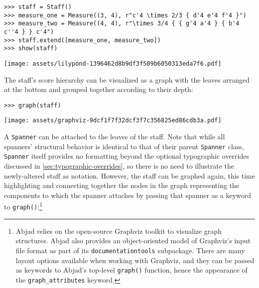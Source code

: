 \begin{abjadbookoutput}
\begin{singlespacing}
\vspace{-0.5\baselineskip}
\begin{verbatim}
>>> staff = Staff()
>>> measure_one = Measure((3, 4), r"c'4 \times 2/3 { d'4 e'4 f'4 }")
>>> measure_two = Measure((4, 4), r"\times 3/4 { { g'4 a'4 } { b'4 c''4 } } c'4")
>>> staff.extend([measure_one, measure_two])
>>> show(staff)
\end{verbatim}
\noindent\texttt{[image: assets/lilypond-1396462d8b9df3f509b6050313eda7f6.pdf]}
\end{singlespacing}
\end{abjadbookoutput}

\noindent The staff's score hierarchy can be visualized as a graph with the
leaves arranged at the bottom and grouped together according to their depth:

\begin{comment}
<abjad>
graph(staff)
</abjad>
\end{comment}

\begin{abjadbookoutput}
\begin{singlespacing}
\vspace{-0.5\baselineskip}
\begin{verbatim}
>>> graph(staff)
\end{verbatim}
\noindent\texttt{[image: assets/graphviz-9dcf1f7f32dcf3f7c356825ed86cdb3a.pdf]}
\end{singlespacing}
\end{abjadbookoutput}

\noindent A \texttt{Spanner} can be attached to the leaves of the staff. Note
that while all spanners' structural behavior is identical to that of their
parent \texttt{Spanner} class, \texttt{Spanner} itself provides no formatting
beyond the optional typographic overrides discussed in
\autoref{sec:typographic-overrides}, so there is no need to illustrate the
newly-altered staff as notation. However, the staff can be graphed again, this
time highlighting and connecting together the nodes in the graph representing
the components to which the spanner attaches by passing that spanner as a
keyword to \texttt{graph()}:\footnote{Abjad relies on the open-source Graphviz
toolkit to visualize graph structures. Abjad also provides an object-oriented
model of Graphviz's input file format as part of its
\texttt{documentationtools} subpackage. There are many layout options available
when working with Graphviz, and they can be passed as keywords to Abjad's
top-level \texttt{graph()} function, hence the appearance of the
\texttt{graph\_attributes} keyword.}

